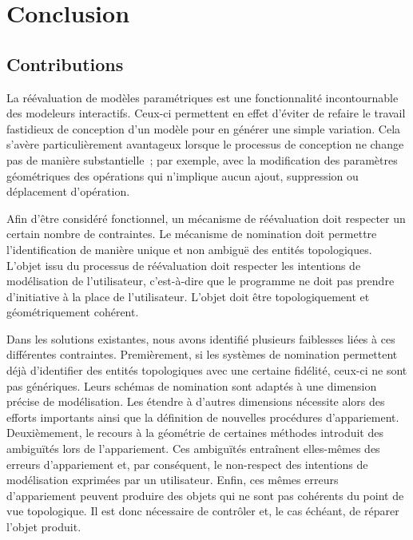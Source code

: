 \clearpage\markboth{}{}
\adjustmtc
\chapter*{Conclusion}
\label{cha:conclusion}



\section*{Contributions}
\newcommand\sectionname{Contributions}
\markboth{Conclusion}{\sectionname}


La réévaluation de modèles paramétriques est une fonctionnalité incontournable
des modeleurs interactifs. %
Ceux-ci permettent en effet d'éviter de refaire le travail fastidieux de
conception d'un modèle pour en générer une simple variation. %
Cela s'avère particulièrement avantageux lorsque le processus de conception ne
change pas de manière substantielle~; par exemple, avec la modification des
paramètres géométriques des opérations qui n'implique aucun ajout, suppression
ou déplacement d'opération. %

Afin d'être considéré fonctionnel, un mécanisme de réévaluation doit respecter
un certain nombre de contraintes. %
Le mécanisme de nomination doit permettre l'identification de manière unique et
non ambiguë des entités topologiques. %
L'objet issu du processus de réévaluation doit respecter les intentions de
modélisation de l'utilisateur, c'est-à-dire que le programme ne doit pas prendre
d'initiative à la place de l'utilisateur. %
L'objet doit être topologiquement et géométriquement cohérent. %

Dans les solutions existantes, nous avons identifié plusieurs faiblesses liées à
ces différentes contraintes. %
Premièrement, si les systèmes de nomination permettent déjà d'identifier des
entités topologiques avec une certaine fidélité, ceux-ci ne sont pas
génériques. %
Leurs schémas de nomination sont adaptés à une dimension précise de
modélisation. %
Les étendre à d'autres dimensions nécessite alors des efforts importants ainsi
que la définition de nouvelles procédures d'appariement. %
Deuxièmement, le recours à la géométrie de certaines méthodes introduit des
ambiguïtés lors de l'appariement. %
Ces ambiguïtés entraînent elles-mêmes des erreurs d'appariement et, par
conséquent, le non-respect des intentions de modélisation exprimées par un
utilisateur. %
Enfin, ces mêmes erreurs d'appariement peuvent produire des objets qui ne sont
pas cohérents du point de vue topologique. %
Il est donc nécessaire de contrôler et, le cas échéant, de réparer l'objet
produit. %



